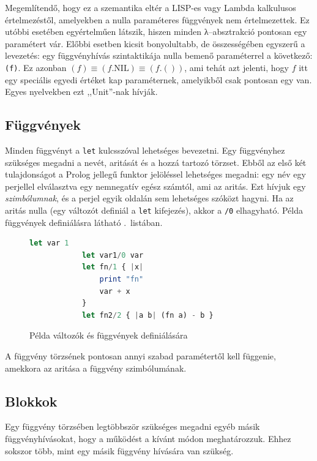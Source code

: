 \documentclass[magyar,12pt,a4paper,final,titlepage]{report}
\def\inlcode#1{{\color{inline-code-color}\tt #1}}
\def\textlambda{λ}
\begin{document}
    Megemlítendő, hogy ez a szemantika eltér a LISP-es vagy Lambda kalkulusos értelmezéstől, amelyekben a nulla paraméteres függvények nem értelmezettek.
    Ez utóbbi esetében egyértelműen látszik, hiszen minden \textlambda--absztrakció pontosan egy paramétert vár.
    Előbbi esetben kicsit bonyolultabb, de összességében egyszerű a levezetés: egy függvényhívás szintaktikája nulla bemenő paraméterrel a következő: {\tt (f)}.
    Ez azonban $(f) \equiv (f . \mathrm{NIL}) \equiv (f . ())$, ami tehát azt jelenti, hogy $f$ itt egy speciális egyedi értéket kap paraméternek, amelyikből csak pontosan egy van.
    Egyes nyelvekben ezt ,,Unit''-nak hívják.

    \subsection{Függvények}

    Minden függvényt a \inlcode{let} kulcsszóval lehetséges bevezetni.
    Egy függvényhez szükséges megadni a nevét, aritását és a hozzá tartozó törzset.
    Ebből az első két tulajdonságot a Prolog jellegű funktor jelöléssel lehetséges megadni: egy név egy perjellel elválasztva egy nemnegatív egész számtól, ami az aritás.
    Ezt hívjuk egy {\sl szimbólumnak}, és a perjel egyik oldalán sem lehetséges szóközt hagyni.
    Ha az aritás nulla (egy változót definiál a \inlcode{let} kifejezés), akkor a {\tt /0} elhagyható.
    Példa függvények definiálásra látható .~listában.

    \begin{figure}
        \begin{lstlisting}[gobble=12,language=haskell]
            let var 1
            let var1/0 var
            let fn/1 { |x|
                print "fn"
                var + x
            }
            let fn2/2 { |a b| (fn a) - b }
        \end{lstlisting}
        \caption{Példa változók és függvények definiálására}\label{lst:funs}
    \end{figure}

    A függvény törzsének pontosan annyi szabad paramétertől kell függenie, amekkora az aritása a függvény szimbólumának.

    \subsection{Blokkok}\label{subsec:block}

    Egy függvény törzsében legtöbbször szükséges megadni egyéb másik függvényhívásokat, hogy a működést a kívánt módon meghatározzuk.
    Ehhez sokszor több, mint egy másik függvény hívására van szükség.
\end{document}
